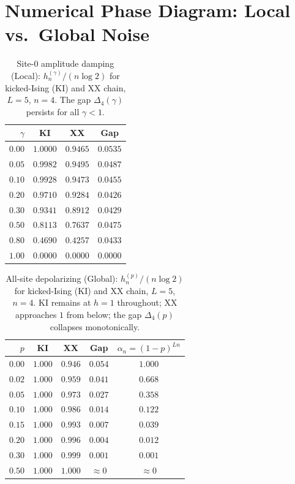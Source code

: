 \documentclass[12pt,a4paper]{article}
\begin{document}
\section{Numerical Phase Diagram: Local vs.\ Global Noise}
\label{sec:noise_phase}

\begin{table}[h]
\centering
\caption{Site-0 amplitude damping (Local): $h_n^{(\gamma)}/(n\log 2)$
for kicked-Ising (KI) and XX chain, $L=5$, $n=4$.
The gap $\Delta_4(\gamma)$ persists for all $\gamma<1$.}
\begin{tabular}{r|cc|c}
\hline
$\gamma$ & KI & XX & Gap \\
\hline
$0.00$ & $1.0000$ & $0.9465$ & $0.0535$ \\
$0.05$ & $0.9982$ & $0.9495$ & $0.0487$ \\
$0.10$ & $0.9928$ & $0.9473$ & $0.0455$ \\
$0.20$ & $0.9710$ & $0.9284$ & $0.0426$ \\
$0.30$ & $0.9341$ & $0.8912$ & $0.0429$ \\
$0.50$ & $0.8113$ & $0.7637$ & $0.0475$ \\
$0.80$ & $0.4690$ & $0.4257$ & $0.0433$ \\
$1.00$ & $0.0000$ & $0.0000$ & $0.0000$ \\
\hline
\end{tabular}
\label{tab:local_noise}
\end{table}

\begin{table}[h]
\centering
\caption{All-site depolarizing (Global): $h_n^{(p)}/(n\log 2)$
for kicked-Ising (KI) and XX chain, $L=5$, $n=4$.
KI remains at $h=1$ throughout; XX approaches $1$ from below;
the gap $\Delta_4(p)$ collapses monotonically.}
\begin{tabular}{r|cc|c|c}
\hline
$p$ & KI & XX & Gap & $\alpha_n=(1-p)^{Ln}$ \\
\hline
$0.00$ & $1.000$ & $0.946$ & $0.054$ & $1.000$ \\
$0.02$ & $1.000$ & $0.959$ & $0.041$ & $0.668$ \\
$0.05$ & $1.000$ & $0.973$ & $0.027$ & $0.358$ \\
$0.10$ & $1.000$ & $0.986$ & $0.014$ & $0.122$ \\
$0.15$ & $1.000$ & $0.993$ & $0.007$ & $0.039$ \\
$0.20$ & $1.000$ & $0.996$ & $0.004$ & $0.012$ \\
$0.30$ & $1.000$ & $0.999$ & $0.001$ & $0.001$ \\
$0.50$ & $1.000$ & $1.000$ & $\approx 0$ & $\approx 0$ \\
\hline
\end{tabular}
\label{tab:global_noise}
\end{table}
\end{document}
